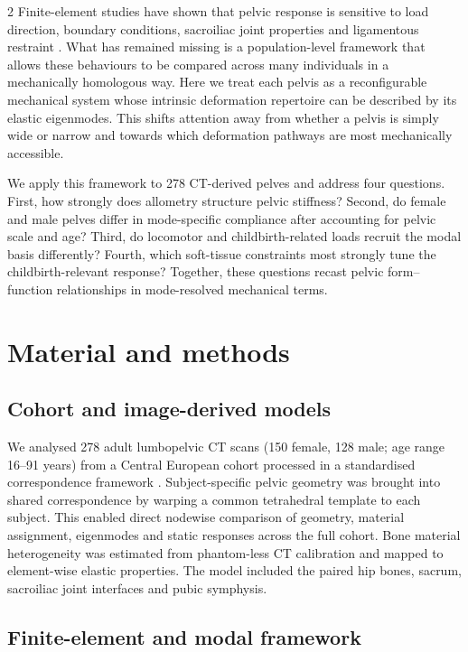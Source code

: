 \documentclass[openacc]{rsproca_new}
\begin{document}
\begin{multicols}{2}
Finite-element studies have shown that pelvic response is sensitive to load direction, boundary conditions, sacroiliac joint properties and ligamentous restraint \cite{Eichenseer2011,Hammer2013,Toyohara2020,Vleeming2012}. What has remained missing is a population-level framework that allows these behaviours to be compared across many individuals in a mechanically homologous way. Here we treat each pelvis as a reconfigurable mechanical system whose intrinsic deformation repertoire can be described by its elastic eigenmodes. This shifts attention away from whether a pelvis is simply wide or narrow and towards which deformation pathways are most mechanically accessible.

We apply this framework to 278 CT-derived pelves and address four questions. First, how strongly does allometry structure pelvic stiffness? Second, do female and male pelves differ in mode-specific compliance after accounting for pelvic scale and age? Third, do locomotor and childbirth-related loads recruit the modal basis differently? Fourth, which soft-tissue constraints most strongly tune the childbirth-relevant response? Together, these questions recast pelvic form--function relationships in mode-resolved mechanical terms.

\section{Material and methods}

\subsection{Cohort and image-derived models}

We analysed 278 adult lumbopelvic CT scans (150 female, 128 male; age range 16--91 years) from a Central European cohort processed in a standardised correspondence framework \cite{Henys2024BoneDat}. Subject-specific pelvic geometry was brought into shared correspondence by warping a common tetrahedral template to each subject. This enabled direct nodewise comparison of geometry, material assignment, eigenmodes and static responses across the full cohort. Bone material heterogeneity was estimated from phantom-less CT calibration and mapped to element-wise elastic properties. The model included the paired hip bones, sacrum, sacroiliac joint interfaces and pubic symphysis.

\subsection{Finite-element and modal framework}


\end{multicols}
\end{document}

